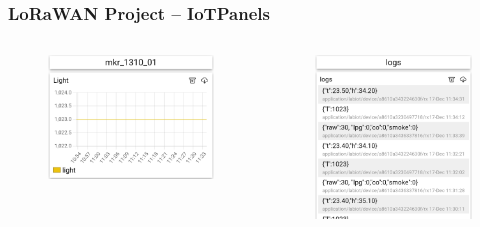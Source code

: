 \documentclass{beamer}
\begin{document}
\begin{frame}
    \frametitle{LoRaWAN Project – IoTPanels}
    \begin{columns}
        \begin{column}{0.5\textwidth}
            \begin{figure}
                \centering
                \includegraphics[width=\textwidth]{images/iotpanel_3.png}
            \end{figure}
        \end{column}
        \begin{column}{0.5\textwidth}
            \begin{figure}
                \centering
                \includegraphics[width=\textwidth]{images/iotpanel_4.png}
            \end{figure}
        \end{column}
    \end{columns}
\end{frame}
\end{document}

